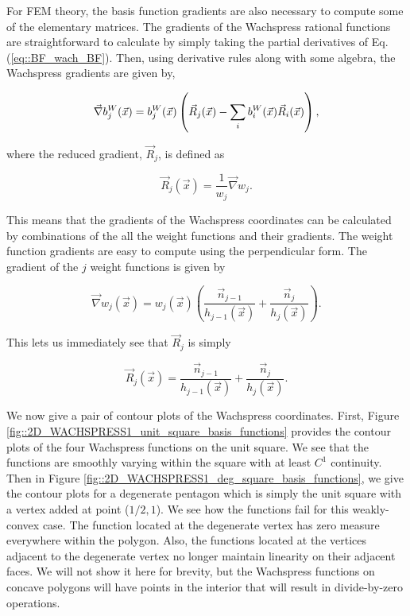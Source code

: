 For FEM theory, the basis function gradients are also necessary to compute some of the elementary matrices. The gradients of the Wachspress rational functions are straightforward to calculate by simply taking the partial derivatives of Eq. (\ref{eq::BF_wach_BF}). Then, using derivative rules along with some algebra, the Wachspress gradients are given by,

\begin{equation}
\label{eq::BF_wach_gradient}
 \vec{\nabla} b_{j}^{W}(\vec{x}) = b_{j}^{W} (\vec{x}) \left( \vec{R}_j  (\vec{x})- \sum\displaylimits_{i}   b_{i}^{W} (\vec{x}) \vec{R}_i (\vec{x}) \right) ,
\end{equation}

\noindent where the reduced gradient, $\vec{R}_j$, is defined as

\begin{equation}
\label{eq::BF_wach_reduced_grad}
\vec{R}_j (\vec{x})  = \frac{1}{w_j} \vec{\nabla} w_j .
\end{equation}

\noindent This means that the gradients of the Wachspress coordinates can be calculated by combinations of the all the weight functions and their gradients. The weight function gradients are easy to compute using the perpendicular form. The gradient of the $j$ weight functions is given by

\begin{equation}
\label{eq::BF_wach_grad_perpdist}
 \vec{\nabla} w_j (\vec{x}) = w_j (\vec{x})  \left(  \frac{\vec{n}_{j-1}}{h_{j-1} (\vec{x})} + \frac{\vec{n}_{j}}{h_{j} (\vec{x})} \right) .
\end{equation}

\noindent This lets us immediately see that $\vec{R}_j$ is simply

\begin{equation}
\label{eq::BF_wach_reduce_grad_form}
\vec{R}_j (\vec{x})  = \frac{\vec{n}_{j-1}}{h_{j-1} (\vec{x})} + \frac{\vec{n}_{j}}{h_{j} (\vec{x})}.
\end{equation}

We now give a pair of contour plots of the Wachspress coordinates. First, Figure \ref{fig::2D_WACHSPRESS1_unit_square_basis_functions} provides the contour plots of the four Wachspress functions on the unit square. We see that the functions are smoothly varying within the square with at least $C^1$ continuity. Then in Figure \ref{fig::2D_WACHSPRESS1_deg_square_basis_functions}, we give the contour plots for a degenerate pentagon which is simply the unit square with a vertex added at point ($1/2,1$). We see how the functions fail for this weakly-convex case. The function located at the degenerate vertex has zero measure everywhere within the polygon. Also, the functions located at the vertices adjacent to the degenerate vertex no longer maintain linearity on their adjacent faces. We will not show it here for brevity, but the Wachspress functions on concave polygons will have points in the interior that will result in divide-by-zero operations.

